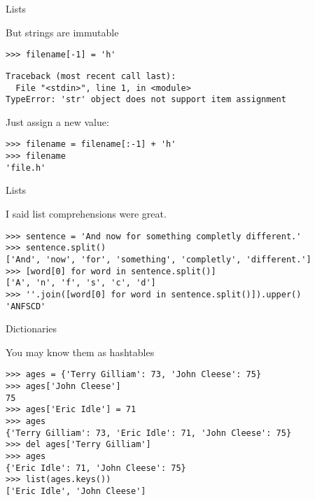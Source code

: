 \documentclass[ignorenonframetext,]{beamer}
\begin{document}
\begin{frame}[fragile]{Lists}

    But strings are immutable

    \begin{tcolorbox}
    \begin{verbatim}
>>> filename[-1] = 'h'
    \end{verbatim}
    \begin{verbatim}
Traceback (most recent call last):
  File "<stdin>", line 1, in <module>
TypeError: 'str' object does not support item assignment
    \end{verbatim}
    \end{tcolorbox}

    \pause
    Just assign a new value:
    \begin{tcolorbox}
    \begin{verbatim}
>>> filename = filename[:-1] + 'h'
>>> filename
'file.h'
    \end{verbatim}
    \end{tcolorbox}
\end{frame}

\begin{frame}[fragile]{Lists}

    I said list comprehensions were great.

    \begin{tcolorbox}
    \begin{verbatim}
>>> sentence = 'And now for something completly different.'
>>> sentence.split()
['And', 'now', 'for', 'something', 'completly', 'different.']
>>> [word[0] for word in sentence.split()]
['A', 'n', 'f', 's', 'c', 'd']
>>> ''.join([word[0] for word in sentence.split()]).upper()
'ANFSCD'
    \end{verbatim}
    \end{tcolorbox}
\end{frame}

\begin{frame}[fragile]{Dictionaries}

    You may know them as hashtables

    \begin{tcolorbox}
    \begin{verbatim}
>>> ages = {'Terry Gilliam': 73, 'John Cleese': 75}
>>> ages['John Cleese']
75
>>> ages['Eric Idle'] = 71
>>> ages
{'Terry Gilliam': 73, 'Eric Idle': 71, 'John Cleese': 75}
>>> del ages['Terry Gilliam']
>>> ages
{'Eric Idle': 71, 'John Cleese': 75}
>>> list(ages.keys())
['Eric Idle', 'John Cleese']
    \end{verbatim}
    \end{tcolorbox}
\end{frame}
\end{document}
